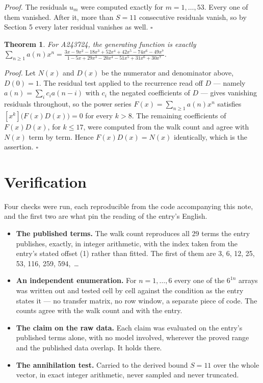 \documentclass[11pt]{article}
\newtheorem{theorem}{Theorem}
\theoremstyle{definition}
\begin{document}
{\itshape Proof.} The residuals $u_m$ were computed exactly for $m = 1,\dots,53$. Every one of them vanished. After it, more than $S = 11$ consecutive residuals vanish, so by Section 5 every later residual vanishes as well. $\square$

\begin{theorem} For A243724, the generating function is exactly $\sum_{n\ge 1} a(n)x^n = \frac{3x - 9x^{2} - 18x^{3} + 52x^{4} + 42x^{5} - 74x^{6} - 49x^{7}}{1 - 5x + 29x^{3} - 20x^{4} - 51x^{5} + 31x^{6} + 30x^{7}}$.\end{theorem}

{\itshape Proof.} Let $N(x)$ and $D(x)$ be the numerator and denominator above, $D(0)=1$. The residual test applied to the recurrence read off $D$ --- namely $a(n) = \sum_i c_i a(n-i)$ with $c_i$ the negated coefficients of $D$ --- gives vanishing residuals throughout, so the power series $F(x)=\sum_{n\ge 1}a(n)x^n$ satisfies $[x^k]\bigl(F(x)D(x)\bigr) = 0$ for every $k > 8$. The remaining coefficients of $F(x)D(x)$, for $k \le 17$, were computed from the walk count and agree with $N(x)$ term by term. Hence $F(x)D(x) = N(x)$ identically, which is the assertion. $\square$

\section{Verification}

Four checks were run, each reproducible from the code accompanying this note, and the first two are what pin the reading of the entry's English.

\begin{itemize}

\item {\bfseries The published terms.} The walk count reproduces all 29 terms the entry publishes, exactly, in integer arithmetic, with the index taken from the entry's stated offset (1) rather than fitted. The first of them are 3, 6, 12, 25, 53, 116, 259, 594,~\dots

\item {\bfseries An independent enumeration.} For $n = 1,\dots,6$ every one of the $6^{1n}$ arrays was written out and tested cell by cell against the condition as the entry states it --- no transfer matrix, no row window, a separate piece of code. The counts agree with the walk count and with the entry.

\item {\bfseries The claim on the raw data.} Each claim was evaluated on the entry's published terms alone, with no model involved, wherever the proved range and the published data overlap. It holds there.

\item {\bfseries The annihilation test.} Carried to the derived bound $S = 11$ over the whole vector, in exact integer arithmetic, never sampled and never truncated.

\end{itemize}
\end{document}
